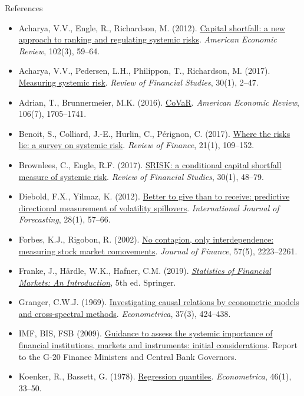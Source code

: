 \begin{frame}{References}
\itemsize{\tiny}
\begin{itemize}
    \item Acharya, V.V., Engle, R., Richardson, M. (2012). \href{https://doi.org/10.1257/aer.102.3.59}{Capital shortfall: a new approach to ranking and regulating systemic risks}. \textit{American Economic Review}, 102(3), 59--64.
    \item Acharya, V.V., Pedersen, L.H., Philippon, T., Richardson, M. (2017). \href{https://doi.org/10.1093/rfs/hhw088}{Measuring systemic risk}. \textit{Review of Financial Studies}, 30(1), 2--47.
    \item Adrian, T., Brunnermeier, M.K. (2016). \href{https://doi.org/10.1257/aer.20120555}{CoVaR}. \textit{American Economic Review}, 106(7), 1705--1741.
    \item Benoit, S., Colliard, J.-E., Hurlin, C., Pérignon, C. (2017). \href{https://doi.org/10.1093/rof/rfw026}{Where the risks lie: a survey on systemic risk}. \textit{Review of Finance}, 21(1), 109--152.
    \item Brownlees, C., Engle, R.F. (2017). \href{https://doi.org/10.1093/rfs/hhw060}{SRISK: a conditional capital shortfall measure of systemic risk}. \textit{Review of Financial Studies}, 30(1), 48--79.
    \item Diebold, F.X., Yilmaz, K. (2012). \href{https://doi.org/10.1016/j.ijforecast.2011.02.006}{Better to give than to receive: predictive directional measurement of volatility spillovers}. \textit{International Journal of Forecasting}, 28(1), 57--66.
    \item Forbes, K.J., Rigobon, R. (2002). \href{https://doi.org/10.1111/0022-1082.00494}{No contagion, only interdependence: measuring stock market comovements}. \textit{Journal of Finance}, 57(5), 2223--2261.
    \item Franke, J., Härdle, W.K., Hafner, C.M. (2019). \href{https://doi.org/10.1007/978-3-030-13751-9}{\textit{Statistics of Financial Markets: An Introduction}}, 5th ed. Springer.
    \item Granger, C.W.J. (1969). \href{https://doi.org/10.2307/1912791}{Investigating causal relations by econometric models and cross-spectral methods}. \textit{Econometrica}, 37(3), 424--438.
    \item IMF, BIS, FSB (2009). \href{https://www.bis.org/publ/othp07.htm}{Guidance to assess the systemic importance of financial institutions, markets and instruments: initial considerations}. Report to the G-20 Finance Ministers and Central Bank Governors.
    \item Koenker, R., Bassett, G. (1978). \href{https://doi.org/10.2307/1913643}{Regression quantiles}. \textit{Econometrica}, 46(1), 33--50.
\end{itemize}
\end{frame}


